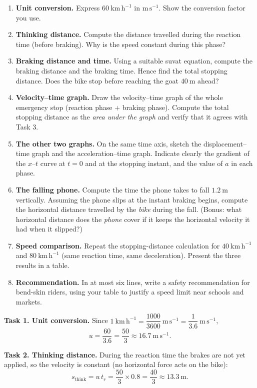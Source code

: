 \documentclass[11pt]{article}
\newcommand{\cle}[1]{{\popxbold\color{popdark}#1}}
\newcounter{popsec}
\newcounter{popsub}
\newcommand{\courssub}[1]{%
  \stepcounter{popsub}%
  \par\vspace{9pt}\noindent{\popxbold\fontsize{11.5}{13}\selectfont\color{popink}{\color{poporange}\thepopsec.\thepopsub}\hspace{6pt}#1}\par\nopagebreak\vspace{4pt}
}
\begin{document}
\begin{enumerate}
\item \textbf{Unit conversion.} Express $60\ \mathrm{km\,h^{-1}}$ in $\mathrm{m\,s^{-1}}$. Show the conversion factor you use.
\item \textbf{Thinking distance.} Compute the distance travelled during the reaction time (before braking). Why is the speed constant during this phase?
\item \textbf{Braking distance and time.} Using a suitable suvat equation, compute the braking distance and the braking time. Hence find the \cle{total stopping distance}. Does the bike stop before reaching the goat $40\ \mathrm{m}$ ahead?
\item \textbf{Velocity--time graph.} Draw the velocity--time graph of the whole emergency stop (reaction phase + braking phase). Compute the total stopping distance as the \emph{area under the graph} and verify that it agrees with Task 3.
\item \textbf{The other two graphs.} On the same time axis, sketch the displacement--time graph and the acceleration--time graph. Indicate clearly the gradient of the $x$--$t$ curve at $t = 0$ and at the stopping instant, and the value of $a$ in each phase.
\item \textbf{The falling phone.} Compute the time the phone takes to fall $1.2\ \mathrm{m}$ vertically. Assuming the phone slips at the instant braking begins, compute the horizontal distance travelled by the \emph{bike} during the fall. (Bonus: what horizontal distance does the \emph{phone} cover if it keeps the horizontal velocity it had when it slipped?)
\item \textbf{Speed comparison.} Repeat the stopping-distance calculation for $40\ \mathrm{km\,h^{-1}}$ and $80\ \mathrm{km\,h^{-1}}$ (same reaction time, same deceleration). Present the three results in a table.
\item \textbf{Recommendation.} In at most six lines, write a safety recommendation for bend-skin riders, using your table to justify a speed limit near schools and markets.
\end{enumerate}

\courssub{Model Answer}

\textbf{Task 1. Unit conversion.}
Since $1\ \mathrm{km\,h^{-1}} = \dfrac{1000}{3600}\ \mathrm{m\,s^{-1}} = \dfrac{1}{3.6}\ \mathrm{m\,s^{-1}}$,
\[ u = \frac{60}{3.6} = \frac{50}{3} \approx 16.7\ \mathrm{m\,s^{-1}}. \]

\textbf{Task 2. Thinking distance.}
During the reaction time the brakes are not yet applied, so the velocity is constant (no horizontal force acts on the bike):
\[ s_{\text{think}} = u\,t_r = \frac{50}{3}\times 0.8 = \frac{40}{3} \approx 13.3\ \mathrm{m}. \]
\end{document}

